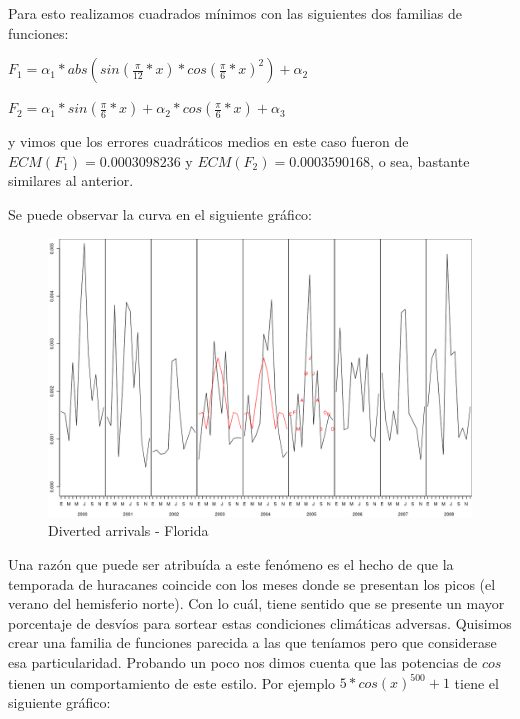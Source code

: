 Para esto realizamos cuadrados m\'inimos con las siguientes dos familias de funciones:

$F_1 = \alpha_1 * abs(sin(\frac{\pi}{12}*x) * cos(\frac{\pi}{6}*x)^2) + \alpha_2$

$F_2 = \alpha_1 * sin(\frac{\pi}{6}*x) + \alpha_2 * cos(\frac{\pi}{6}*x) + \alpha_3$

y vimos que los errores cuadr\'aticos medios en este caso fueron de $ECM(F_1) = 0.0003098236$ y $ECM(F_2) = 0.0003590168$, o sea, bastante similares al anterior.

Se puede observar la curva en el siguiente gr\'afico:

\begin{figure}[h!]
  \begin{center}
	\includegraphics[scale=0.4]{img/plot_FL_2003-2005.png}
	\caption{Diverted arrivals - Florida}
  \end{center}
  \label{diverted-arrivals-florida}
\end{figure}

Una raz\'on que puede ser atribu\'ida a este fen\'omeno es el hecho de que la temporada de huracanes coincide con los meses donde se presentan los picos (el verano del hemisferio norte). Con lo cu\'al, tiene sentido que se presente un mayor porcentaje de desv\'ios para sortear estas condiciones clim\'aticas adversas. Quisimos crear una familia de funciones parecida a las que ten\'iamos pero que considerase esa particularidad.
Probando un poco nos dimos cuenta que las potencias de $cos$ tienen un comportamiento de este estilo. Por ejemplo $5*cos(x)^{500} + 1$ tiene el siguiente gr\'afico:

